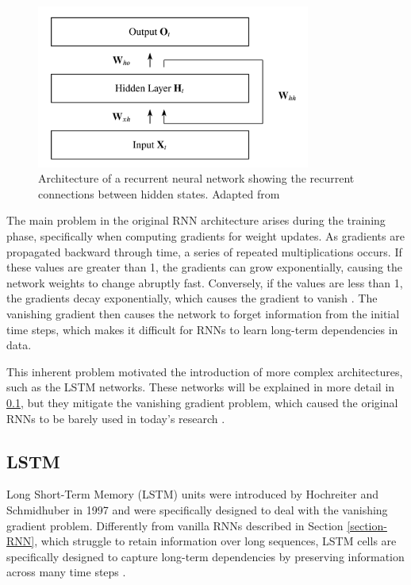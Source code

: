 \begin{figure}[H]
    \centering
    \includegraphics[width=9cm]{Cap2_LitReview/model_basics/RNN/rnn.png}
    \caption{Architecture of a recurrent neural network showing the recurrent connections between hidden states. Adapted from \cite{schmidt2019recurrentneuralnetworksrnns}}
    \label{fig:RNN-struct}
\end{figure}

The main problem in the original RNN architecture arises during the training phase, specifically when computing gradients for weight updates. As gradients are propagated backward through time, a series of repeated multiplications occurs. If these values are greater than 1, the gradients can grow exponentially, causing the network weights to change abruptly fast. Conversely, if the values are less than 1, the gradients decay exponentially, which causes the gradient to vanish \cite{kolen,pmlr-v9-glorot10a}. The vanishing gradient then causes the network to forget information from the initial time steps, which makes it difficult for RNNs to learn long-term dependencies in data.

This inherent problem motivated the introduction of more complex architectures, such as the LSTM networks. These networks will be explained in more detail in \ref{sec-LSTM}, but they mitigate the vanishing gradient problem, which caused the original RNNs to be barely used in today's research \cite{fang-wei,GAO2019279}.

\subsection{LSTM} \label{sec-LSTM}

Long Short-Term Memory (LSTM) units were introduced by Hochreiter and Schmidhuber in 1997 \cite{Hochreiter} and were specifically designed to deal with the vanishing gradient problem. Differently from vanilla RNNs described in Section \ref{section-RNN}, which struggle to retain information over long sequences, LSTM cells are specifically designed to capture long-term dependencies by preserving information across many time steps \cite{ALSELWI2024102068}.

